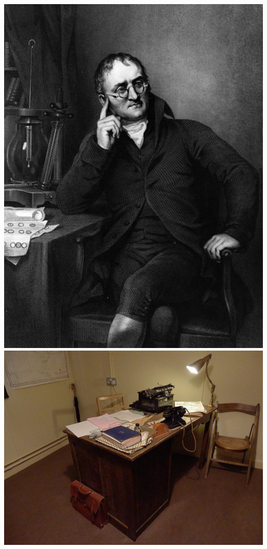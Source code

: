 \documentclass[
]{book}
\begin{document}
\includegraphics[width=6.28in]{imgs/Dalton_John_desk}
\includegraphics[width=6.94in]{imgs/alan_turing_desk}
\end{document}
